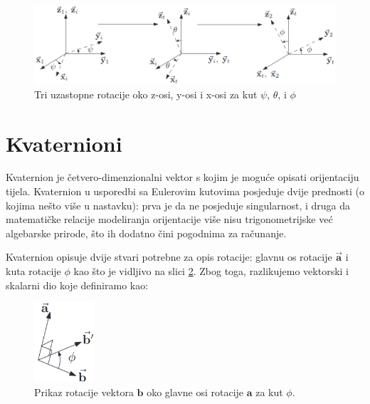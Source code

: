 \documentclass[times, utf8, diplomski, numeric]{templates/template}
\begin{document}
{{        \begin{figure}[htb]
        \centering
        \includegraphics[width=1.0\textwidth]{images/eulerovi_kutovi.jpg}
        \caption{Tri uzastopne rotacije oko z-osi, y-osi i x-osi za kut $\psi$, $\theta$, i $\phi$}
        \label{fig:euler_rotacija}
        \end{figure}
    }

    \section{Kvaternioni}{
        Kvaternion je četvero-dimenzionalni vektor s kojim je moguće opisati orijentaciju tijela. Kvaternion u usporedbi sa Eulerovim kutovima posjeduje dvije prednosti (o kojima nešto više u nastavku): prva je da ne posjeduje singularnost, i druga da matematičke relacije modeliranja orijentacije više nisu trigonometrijske već algebarske prirode, što ih dodatno čini pogodnima za računanje.

        Kvaternion opisuje dvije stvari potrebne za opis rotacije: glavnu os rotacije  $\overrightarrow{\textbf{a}}$ i kuta rotacije $\phi$ kao što je vidljivo na slici \ref{fig:principal_axis_rotation}. Zbog toga, razlikujemo vektorski i skalarni dio koje definiramo kao:

        \begin{figure}[htb]
        \centering
        \includegraphics[width=0.2\textwidth]{images/principal_axis_rotation.png}
        \caption{Prikaz rotacije vektora $\textbf{b}$ oko glavne osi rotacije $\textbf{a}$ za kut $\phi$.}
        \label{fig:principal_axis_rotation}
        \end{figure}

}}
\end{document}
